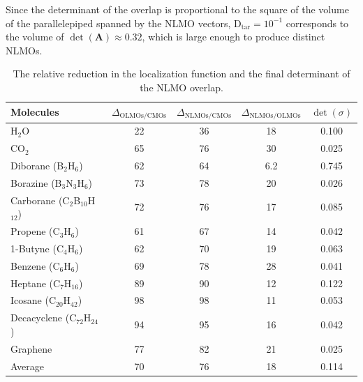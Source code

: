 \documentclass[aps,prl,reprint,amsmath,amssymb]{revtex4-1}
\begin{document}
Since the determinant of the overlap is proportional to the square of the volume of the parallelepiped spanned by the NLMO vectors, $\text{D}_{\text{tar}}=10^{-1}$ corresponds to the volume of $\det(\mathbf{A})\approx 0.32$, which is large enough to produce distinct NLMOs.
%
\begin{table}[htbp]
\caption{The relative reduction in the localization function and the final determinant of the NLMO overlap.}
\label{tab:loc}
\centering
\begin{tabular}{l c c c c}
\hline\hline
Molecules & $\Delta_{\text{OLMOs/CMOs}}$  & $\Delta_{\text{NLMOs/CMOs}}$ & $\Delta_{\text{NLMOs/OLMOs}}$ & $\det(\sigma)$ \\
\hline
H$_2$O & 22 & 36 & 18 & 0.100 \\ 
CO$_2$ & 65 & 76 & 30 & 0.025 \\
Diborane (B$_2$H$_6$) & 62 & 64 & 6.2 & 0.745 \\
Borazine (B$_3$N$_3$H$_6$) & 73 & 78 & 20 & 0.026 \\
Carborane (C$_2$B$_{10}$H$_{12}$) & 72 & 76 & 17 & 0.085 \\ 
Propene (C$_3$H$_6$) & 61 & 67 & 14 & 0.042 \\
1-Butyne (C$_4$H$_6$) & 62 & 70 & 19 & 0.063 \\
Benzene (C$_6$H$_6$) & 69 & 78 & 28 & 0.041 \\ 
Heptane (C$_7$H$_{16}$) & 89 & 90 & 12 & 0.122 \\ 
Icosane (C$_{20}$H$_{42}$) & 98 & 98 & 11 & 0.053 \\ 
Decacyclene (C$_{72}$H$_{24}$) & 94 & 95 & 16 & 0.042 \\ 
Graphene & 77 & 82 & 21 & 0.025 \\
\hline
Average & 70 & 76 & 18 & 0.114 \\
\hline
\hline
\end{tabular}
\label{table:nonlin}
\end{table}
%
\end{document}
